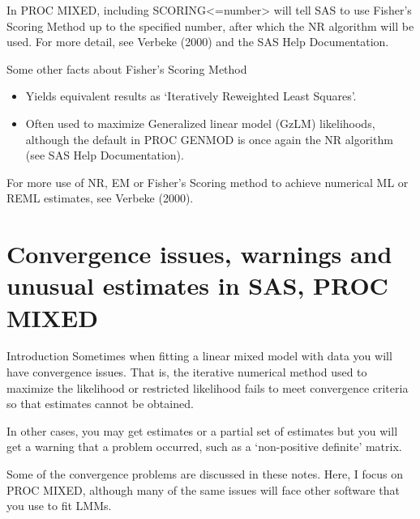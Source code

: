 \documentclass[
  9pt,
  ignorenonframetext,
]{beamer}
\begin{document}
\begin{frame}{}
\protect\hypertarget{section-4}{}
In PROC MIXED, including SCORING\textless=number\textgreater{} will tell
SAS to use Fisher's Scoring Method up to the specified number, after
which the NR algorithm will be used. For more detail, see Verbeke (2000)
and the SAS Help Documentation.

Some other facts about Fisher's Scoring Method

\begin{itemize}
\item
  Yields equivalent results as `Iteratively Reweighted Least Squares'.
\item
  Often used to maximize Generalized linear model (GzLM) likelihoods,
  although the default in PROC GENMOD is once again the NR algorithm
  (see SAS Help Documentation).
\end{itemize}

For more use of NR, EM or Fisher's Scoring method to achieve numerical
ML or REML estimates, see Verbeke (2000).
\end{frame}

\hypertarget{convergence-issues-warnings-and-unusual-estimates-in-sas-proc-mixed}{%
\section{Convergence issues, warnings and unusual estimates in SAS, PROC
MIXED}\label{convergence-issues-warnings-and-unusual-estimates-in-sas-proc-mixed}}

\begin{frame}{Introduction}
\protect\hypertarget{introduction}{}
Sometimes when fitting a linear mixed model with data you will have
convergence issues. That is, the iterative numerical method used to
maximize the likelihood or restricted likelihood fails to meet
convergence criteria so that estimates cannot be obtained.

In other cases, you may get estimates or a partial set of estimates but
you will get a warning that a problem occurred, such as a `non-positive
definite' matrix.

Some of the convergence problems are discussed in these notes. Here, I
focus on PROC MIXED, although many of the same issues will face other
software that you use to fit LMMs.
\end{frame}
\end{document}
